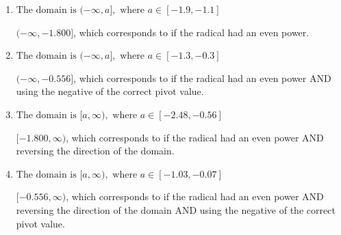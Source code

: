 \documentclass{extbook}[14pt]
\begin{document}
\begin{enumerate}
{\begin{enumerate}[label=\Alph*.]
* This is the correct option since the radical has an odd power.
\item \( \text{The domain is } (-\infty, a], \text{   where } a \in [-1.9, -1.1] \)

$(-\infty, -1.800]$, which corresponds to if the radical had an even power.
\item \( \text{The domain is } (-\infty, a], \text{   where } a \in [-1.3, -0.3] \)

$(-\infty, -0.556]$, which corresponds to if the radical had an even power AND using the negative of the correct pivot value.
\item \( \text{The domain is } [a, \infty), \text{   where } a \in [-2.48, -0.56] \)

$[-1.800, \infty)$, which corresponds to if the radical had an even power AND reversing the direction of the domain.
\item \( \text{The domain is } [a, \infty), \text{   where } a \in [-1.03, -0.07] \)

$[-0.556, \infty)$, which corresponds to if the radical had an even power AND reversing the direction of the domain AND using the negative of the correct pivot value.
\end{enumerate}

}
\end{enumerate}
\end{document}
